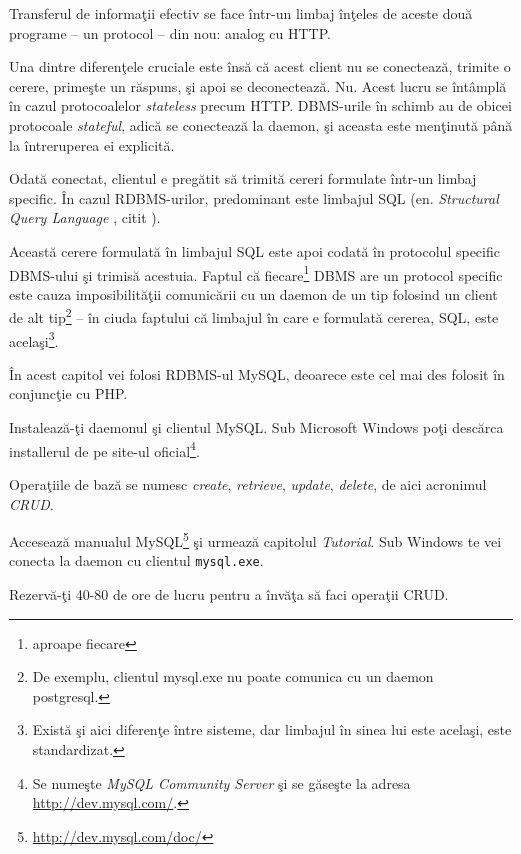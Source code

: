 Transferul de informaţii efectiv se face într-un limbaj înţeles
de aceste două programe -- un protocol -- din nou: analog cu HTTP.

Una dintre diferenţele cruciale este însă că acest client nu se
conectează, trimite o cerere, primeşte un răspuns, şi apoi se
deconectează. Nu. Acest lucru se întâmplă în cazul protocoalelor
\textit{stateless} precum HTTP. DBMS-urile în schimb au de obicei
protocoale \textsl{stateful}, adică se conectează la daemon, şi
aceasta este menţinută până la întreruperea ei explicită.

Odată conectat, clientul e pregătit să trimită cereri formulate
într-un limbaj specific. În cazul RDBMS-urilor, predominant este
limbajul SQL (en. \textsl{Structural Query Language}
, citit \texttt{}).%

Această cerere formulată în limbajul SQL este apoi codată în
protocolul specific DBMS-ului şi trimisă acestuia.
Faptul că fiecare\footnote{aproape fiecare} DBMS are un protocol
specific este cauza imposibilităţii comunicării cu un daemon
de un tip folosind un client de alt tip\footnote{De exemplu,
clientul mysql.exe nu poate comunica cu un daemon postgresql.}
-- în ciuda faptului că limbajul în care e formulată cererea, SQL,
este acelaşi\footnote{Există şi aici diferenţe între sisteme,
dar limbajul în sinea lui este acelaşi, este standardizat.}.

În acest capitol vei folosi RDBMS-ul MySQL, deoarece este
cel mai des folosit în conjuncţie cu PHP.

\begin{Exercise}[title={Primii paşi în baze de date}]
\ExePart

Instalează-ţi daemonul şi clientul MySQL. Sub Microsoft
Windows poţi descărca installerul de pe site-ul
oficial\footnote{Se numeşte \textit{MySQL Community Server} şi se găseşte
la adresa \url{http://dev.mysql.com/}.}.

\ExePart

Operaţiile de bază se numesc \textit{create}, \textit{retrieve},
\textit{update}, \textit{delete}, de aici acronimul \textsl{CRUD}.

Accesează manualul MySQL\footnote{\url{http://dev.mysql.com/doc/}}
şi urmează capitolul \textit{Tutorial}. Sub Windows te vei conecta la daemon
cu clientul \texttt{mysql.exe}.

Rezervă-ţi 40-80 de ore de lucru pentru a învăţa să faci operaţii CRUD.
\end{Exercise}

